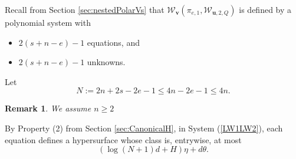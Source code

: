 \documentclass[12pt]{article}
\newtheorem{remark}[theorem]{Remark}
\begin{document}
\begin{itemize}
\begin{enumerate}
\begin{enumerate}
%
Recall from Section \ref{sec:nestedPolarVs} that $\mathscr{W}_{\bm v}(\pi_{e,1},\mathscr{W}_{\bm u,2,Q})$ is defined by a polynomial system with
    \begin{itemize}
        \item $2(s+n-e)-1$ equations, and
        \item $2(s+n-e)-1$ unknowns. 
    \end{itemize}
\noindent 
Let 
\[
N := 2n+2s-2e-1 \leq 4n-2e-1 \leq 4n.
\]
\begin{remark}
We assume $n \geq 2$
\end{remark}
By Property (2) from Section \ref{sec:CanonicalH}, in System (\ref{LW1LW2}), each equation defines a hypersurface whose class is, entrywise, at most  
%
\[
(\log(N+1)d + H)\eta + d\theta.
\]







\end{enumerate}
\end{enumerate}
\end{itemize}
\end{document}

